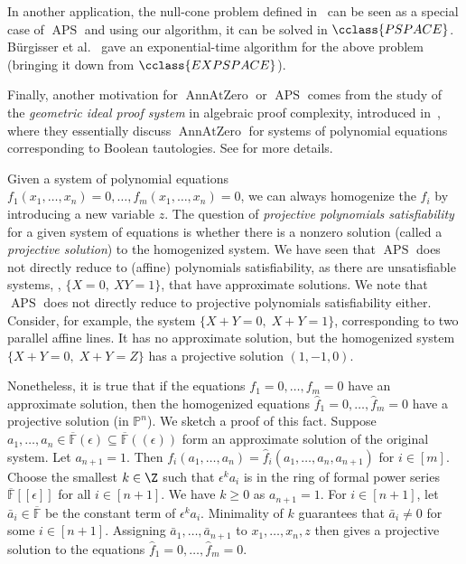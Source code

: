 \documentclass{toc}
\newcommand{\F}{\mathbb{F}}
\newcommand{\proj}{\mathbb{P}}
\newcommand{\PSPACE}{\cclass{PSPACE}\xspace}  %
\newcommand{\EXPSPACE}{\cclass{EXPSPACE}\xspace} %
\DeclareMathOperator{\APS}{\mathrm{APS}\xspace} %
\DeclareMathOperator{\AnnAtZero}{\mathrm{AnnAtZero}\xspace} %
\begin{document}
In another application, the null-cone problem defined in~\cite{brgisser_et_al:LIPIcs:2018:8351} can be seen as a special case of $\APS$ and using our algorithm, it can be solved in $\PSPACE$. B\"urgisser et al.~\cite{brgisser_et_al:LIPIcs:2018:8351} gave an 
%
exponential-time  %
algorithm for the above problem (bringing it down from
%
$\EXPSPACE$).   %
%

Finally, another motivation for $\AnnAtZero$ or $\APS$ comes from the study of
the  %
\emph{geometric ideal proof system} in algebraic proof complexity, introduced in~\cite{grochow2018circuit}, where they essentially discuss $\AnnAtZero$ for systems of polynomial equations corresponding to Boolean tautologies.
See \cite[Appendix B]{grochow2018circuit} for more details.


%

\smallskip
\noindent
%
%
\begin{remark}
Given a system of polynomial equations $f_1(x_1, \ldots, x_n)=0,\ldots,f_m(x_1, \ldots, x_n)=0$, we can always homogenize
%
the $f_i$  %
by introducing a new variable $z$. The question of \emph{projective polynomials satisfiability} for a given system of equations is whether there is a nonzero solution  (called a \emph{projective solution}) to the homogenized system. We have seen that $\APS$ does not directly reduce to (affine) polynomials satisfiability, as there are unsatisfiable systems, \eg, $\{X=0,~XY=1\}$, that have approximate solutions. We note that $\APS$ does not directly reduce to projective polynomials satisfiability
%
either.  Consider, for example,  %
the system $\{X+Y=0,\;X+Y=1\}$, corresponding to two parallel affine lines. It has no approximate solution, but the homogenized system $\{X+Y=0,\; X+Y=Z\}$ has a projective solution $(1, -1, 0)$. 

Nonetheless, it is true that if the equations $f_1=0, \dots, f_m=0$ have an approximate solution, then the homogenized equations $\hat{f}_1=0,\dots,\hat{f}_m=0$  have a projective solution (in $\proj^n$). We sketch a proof
%
of    %
this fact. %
Suppose $a_1,\dots,a_n \in \overline{\F}(\epsilon)\subseteq  \overline{\F}((\epsilon))$ form an approximate solution of the original system.
%
 Let $a_{n+1}=1$.
Then   $f_i(a_1,\dots,a_n)=\hat{f}_{i}(a_1,\dots,a_n,a_{n+1})$ for $i\in [m]$.
Choose the smallest $k\in\Z$ such that $\epsilon^k a_i$ is in the ring of formal power series $\overline{\F}[[\epsilon]]$ for all $i\in [n+1]$.
We have $k\geq 0$ as $a_{n+1}=1$. 
For $i\in [n+1]$, let $\bar{a}_i\in \overline{\F}$ be the constant term of $\epsilon^k a_i$.
Minimality of $k$ guarantees that   $\bar{a}_i\neq 0$  for some $i\in [n+1]$.
Assigning $\bar{a}_1,\dots,\bar{a}_{n+1}$ to $x_1,\dots,x_n,z$ then gives a projective solution to the equations $\hat{f}_1=0,\dots,\hat{f}_m=0$.
\end{remark}  %
\end{document}
